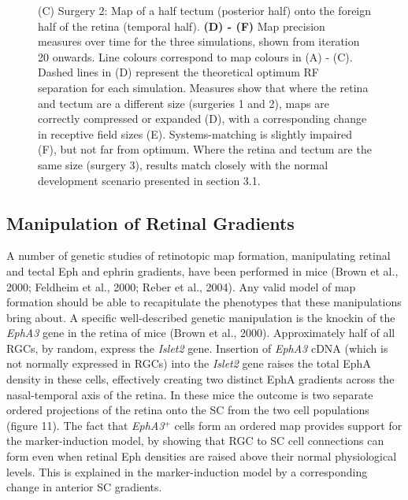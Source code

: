 \documentclass[11pt]{"article"}
\begin{document}
\begin{figure}[!h]
{(C) Surgery 2: Map of a half tectum (posterior half) onto the foreign half of the retina (temporal half).
\textbf{(D) - (F)} Map precision measures over time for the three simulations, shown from iteration 20 onwards. Line colours correspond to map colours in (A) - (C). Dashed lines in (D) represent the theoretical optimum RF separation for each simulation. Measures show that where the retina and tectum are a different size (surgeries 1 and 2), maps are correctly compressed or expanded (D), with a corresponding change in receptive field sizes (E). Systems-matching is slightly impaired (F), but not far from optimum. Where the retina and tectum are the same size (surgery 3), results match closely with the normal development scenario presented in section 3.1.}
\end{figure}
\pagebreak

\subsection{Manipulation of Retinal Gradients}
A number of genetic studies of retinotopic map formation, manipulating retinal and tectal Eph and ephrin gradients, have been performed in mice (Brown et al., 2000; Feldheim et al., 2000; Reber et al., 2004). Any valid model of map formation should be able to recapitulate the phenotypes that these manipulations bring about. A specific well-described genetic manipulation is the knockin of the \textit{EphA3} gene in the retina of mice (Brown et al., 2000). Approximately half of all RGCs, by random, express the \textit{Islet2} gene. Insertion of \textit{EphA3} cDNA (which is not normally expressed in RGCs) into the \textit{Islet2} gene raises the total EphA density in these cells, effectively creating two distinct EphA gradients across the nasal-temporal axis of the retina. In these mice the outcome is two separate ordered projections of the retina onto the SC from the two cell populations (figure 11). The fact that \textit{EphA3}$^+$ cells form an ordered map provides support for the marker-induction model, by showing that RGC to SC cell connections can form even when retinal Eph densities are raised above their normal physiological levels. This is explained in the marker-induction model by a corresponding change in anterior SC gradients.\\
\end{document}
